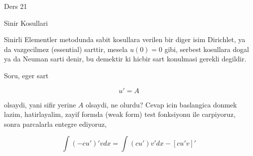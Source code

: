 \documentclass[12pt,fleqn]{article}\usepackage{../common}
\begin{document}
Ders 21

Sinir Kosullari

Sinirli Elementler metodunda sabit kosullara verilen bir diger isim
Dirichlet, ya da vazgecilmez (essential) sarttir, mesela $u(0) = 0$ gibi,
serbest kosullara dogal ya da Neuman sarti denir, bu demektir ki hicbir
sart konulmasi gerekli degildir. 

Soru, eger sart 

\[ u' = A \]

olsaydi, yani sifir yerine $A$ olsaydi, ne olurdu? Cevap icin baslangica
donmek lazim, hatirlayalim, zayif formda (weak form) test fonksiyonu ile
carpiyoruz, sonra parcalarla entegre ediyoruz,

\[ \int (-cu')' vdx = \int (cu')v' dx - [cu'v]' \]
\end{document}
